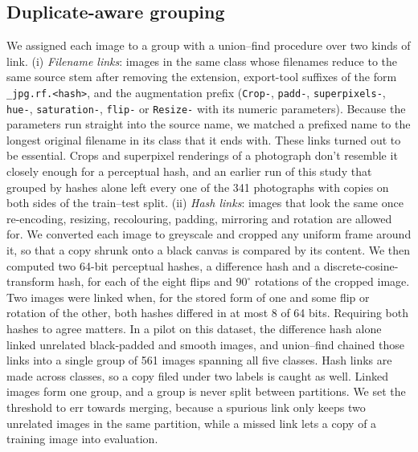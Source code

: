 \documentclass[11pt]{article}
\begin{document}
\subsection*{Duplicate-aware grouping}
We assigned each image to a group with a union--find procedure over two kinds of link. (i) \emph{Filename links}: images in the same class whose filenames reduce to the same source stem after removing the extension, export-tool suffixes of the form \texttt{\_jpg.rf.<hash>}, and the augmentation prefix (\texttt{Crop-}, \texttt{padd-}, \texttt{superpixels-}, \texttt{hue-}, \texttt{saturation-}, \texttt{flip-} or \texttt{Resize-} with its numeric parameters). Because the parameters run straight into the source name, we matched a prefixed name to the longest original filename in its class that it ends with. These links turned out to be essential. Crops and superpixel renderings of a photograph don't resemble it closely enough for a perceptual hash, and an earlier run of this study that grouped by hashes alone left every one of the 341 photographs with copies on both sides of the train--test split. (ii) \emph{Hash links}: images that look the same once re-encoding, resizing, recolouring, padding, mirroring and rotation are allowed for. We converted each image to greyscale and cropped any uniform frame around it, so that a copy shrunk onto a black canvas is compared by its content. We then computed two 64-bit perceptual hashes\cite{zauner2010}, a difference hash and a discrete-cosine-transform hash, for each of the eight flips and $90^\circ$ rotations of the cropped image. Two images were linked when, for the stored form of one and some flip or rotation of the other, both hashes differed in at most 8 of 64 bits. Requiring both hashes to agree matters. In a pilot on this dataset, the difference hash alone linked unrelated black-padded and smooth images, and union--find chained those links into a single group of 561 images spanning all five classes. Hash links are made across classes, so a copy filed under two labels is caught as well. Linked images form one group, and a group is never split between partitions. We set the threshold to err towards merging, because a spurious link only keeps two unrelated images in the same partition, while a missed link lets a copy of a training image into evaluation.
\end{document}
